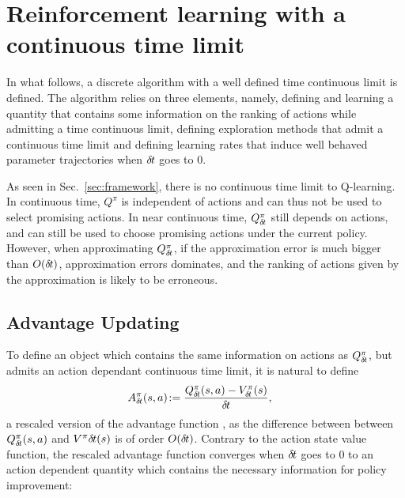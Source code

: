 \section{Reinforcement learning with a continuous time limit}

In what follows, a discrete algorithm with a well defined time continuous
limit is defined. The algorithm relies on three elements, namely, defining and
learning a quantity that contains some information on the ranking of actions
while admitting a time continuous limit, defining exploration methods that
admit a continuous time limit and defining learning rates that induce well
behaved parameter trajectories when ${\delta\hspace{-.1em}t}$ goes to $0$.

As seen in Sec.~\ref{sec:framework}, there is no continuous time limit to
Q-learning. In continuous time, $Q^\pi$ is independent of actions and can thus
not be used to select promising actions.  In near continuous time, $Q^\pi_{\delta\hspace{-.1em}t}$
still depends on actions, and can still be used to choose promising actions
under the current policy. However, when approximating $Q^\pi_{\delta\hspace{-.1em}t}$, if the
approximation error is much bigger than $O({\delta\hspace{-.1em}t})$, approximation errors
dominates, and the ranking of actions given by the approximation is likely to
be erroneous.

\subsection{Advantage Updating}
\label{subsec:reparam}
To define an object which contains the same information on actions as
$Q^\pi_{\delta\hspace{-.1em}t}$, but admits an action dependant continuous time limit, it is
natural to define \cite{adv_upd}
\begin{align}
	A^\pi_{\delta\hspace{-.1em}t}(s, a) &\colon\hspace{-.6em}= \frac{Q^\pi_{\delta\hspace{-.1em}t}(s,a) - V^\pi_{\delta\hspace{-.1em}t}(s)}{{\delta\hspace{-.1em}t}},
    \label{eq:adv}
\end{align}
a rescaled version of the advantage function \cite{adv_upd}, as the difference between between
$Q^\pi_{\delta\hspace{-.1em}t}(s, a)$ and $V^\pi{\delta\hspace{-.1em}t}(s)$ is of order $O({\delta\hspace{-.1em}t})$.
Contrary to the action state value function, the rescaled advantage function converges when ${\delta\hspace{-.1em}t}$ goes to $0$
to an action dependent quantity which contains the necessary information for policy improvement:


